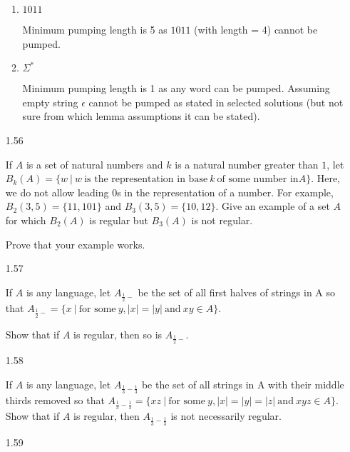 \begin{enumerate}
\begin{enumerate}
                  \item $1011$
                        
                        Minimum pumping length is 5 as $1011$ (with length = 4) cannot be pumped.
                        
                  \item $\Sigma^\ast$
                        
                        Minimum pumping length is 1 as any word can be pumped. Assuming empty string $\epsilon$ cannot be pumped as stated in selected solutions (but not sure from which lemma assumptions it can be stated).
                        
            \end{enumerate}
            
      \item [1.56]
            
            If $A$ is a set of natural numbers and $k$ is a natural number greater than $1$, let $B_k(A)=\{w~|~w~ \text{is the representation in base}~k~\text{of some number in} A\}$. Here, we do not allow leading $0$s in the representation of a number. For example, $B_2({3,5})=\{11,101\}$ and $B_3({3,5})=\{10,12\}$. Give an example of a set $A$ for which $B_2(A)$ is regular but $B_3(A)$ is not regular. 
            
            Prove that your example works.
            
      \item [1.57]
            
            If $A$ is any language, let $A_{\frac{1}{2}-}$ be the set of all first halves of strings in A so that $A_{\frac{1}{2}-} = \{x~|~ \text{for some}~ y, |x| = |y| ~\text{and}~ xy \in A\}$. 
            
            Show that if $A$ is regular, then so is $A_{\frac{1}{2}-}$.
            
      \item [1.58]
            
            If $A$ is any language, let $A_{\frac{1}{3}-\frac{1}{3}}$ be the set of all strings in A with their middle thirds removed so that $A_{\frac{1}{3}-\frac{1}{3}} = \{xz~|~ \text{for some}~ y, |x| = |y| = |z|~ \text{and}~ xyz \in A\}$. Show that if $A$ is regular, then $A_{\frac{1}{3}-\frac{1}{3}}$ is not necessarily regular.
            
      \item [1.59]
            

\end{enumerate}

